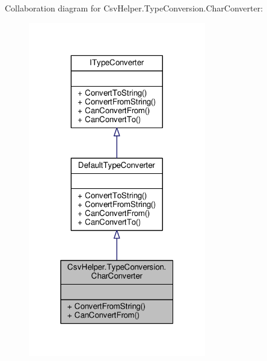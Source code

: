 Collaboration diagram for Csv\-Helper.\-Type\-Conversion.\-Char\-Converter\-:
\nopagebreak
\begin{figure}[H]
\begin{center}
\leavevmode
\includegraphics[width=220pt]{a00487}
\end{center}
\end{figure}

